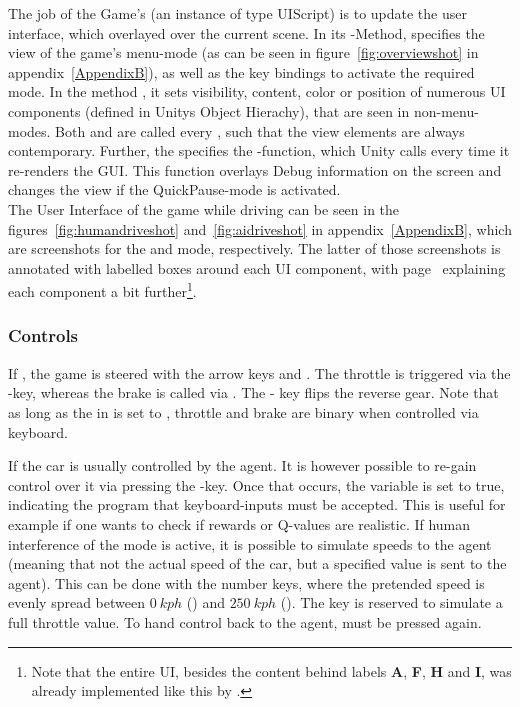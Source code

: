 The job of the Game's  (an instance of type UIScript) is to update the user interface, which overlayed over the current scene. In its -Method,  specifies the view of the game's menu-mode (as can be seen in figure~\ref{fig:overviewshot} in appendix~\ref{AppendixB}), as well as the key bindings to activate the required mode. In the method , it sets visibility, content, color or position of numerous UI components (defined in Unitys Object Hierachy), that are seen in non-menu-modes. Both  and  are called every , such that the view elements are always contemporary. Further, the  specifies the -function, which Unity calls every time it re-renders the GUI. This function overlays Debug information on the screen and changes the view if the QuickPause-mode is activated.\\

\noindent The User Interface of the game while driving can be seen in the figures~\ref{fig:humandriveshot} and~\ref{fig:aidriveshot} in appendix~\ref{AppendixB}, which are screenshots for the  and  mode, respectively. The latter of those screenshots is annotated with labelled boxes around each UI component, with page~\pageref{fig:aidriveshot} explaining each component a bit further\footnote{Note that the entire UI, besides the content behind labels \textbf{A}, \textbf{F}, \textbf{H} and \textbf{I}, was already implemented like this by \leon.}.

\subsubsection{Controls}

If , the game is steered with the arrow keys \keystroke{$\leftarrow$} and \mbox{\keystroke{$\rightarrow$}.} The throttle is triggered via the -key, whereas the brake is called via . The  - key flips the reverse gear. Note that as long as the  in  is set to , throttle and brake are binary when controlled via keyboard. 

If  the car is usually controlled by the agent. It is however possible to re-gain control over it via pressing the -key. Once that occurs, the variable  is set to true, indicating the program that keyboard-inputs must be accepted. This is useful for example if one wants to check if rewards or Q-values are realistic. If human interference of the  mode is active, it is possible to simulate speeds to the agent (meaning that not the actual speed of the car, but a specified value is sent to the agent). This can be done with the number keys, where the pretended speed is evenly spread between $0~ kph$ () and $250~ kph$ (). The  key is reserved to simulate a full throttle value. To hand control back to the agent,  must be pressed again. 

